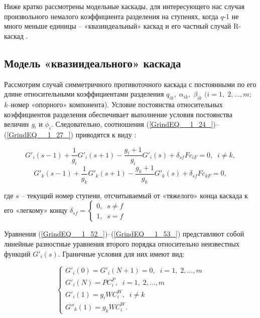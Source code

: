 Ниже кратко рассмотрены модельные каскады, для интересующего нас случая произвольного немалого коэффициента разделения на ступенях, когда $q$-1 не много меньше единицы  -- «квазиидеальный» каскад и его частный случай R-каскад \cite{sazykinKvaziidealnyeKaskadyDlya2000}.

\subsection{Модель «квазиидеального» каскада}

Рассмотрим случай симметричного противоточного каскада с постоянными по его длине относительными коэффициентами разделения $q_{ik} ,\; \alpha _{ik} ,\; \beta _{ik} $ $(i=1,\; 2,...,m;$ \textit{k}--номер «опорного» компонента). Условие постоянства относительных коэффициентов разделения обеспечивает выполнение условия постоянства величин \textit{g${}_{i}$} и $\phi _{i} $. Следовательно, соотношения (\ref{GrindEQ__1_24_})--(\ref{GrindEQ__1_27_}) приводятся к виду \cite{sulaberidzeTeoriyaKaskadovDlya2011}:

\begin{equation} \label{GrindEQ__1_52_} 
  G'_{i} (s-1)+\frac{1}{g_{i} } G'_{i} (s+1)-\frac{g_{i} +1}{g_{i} } G'_{i} (s)+\delta _{sf} Fc_{iF} =0,\; \; i\ne k, 
  \end{equation} 
  \begin{equation} \label{GrindEQ__1_53_} 
  G'_{k} (s-1)+\frac{1}{g_{k} } G'_{k} (s+1)-\frac{g_{k} +1}{g_{k} } G'_{k} (s)+\delta _{sf} Fc_{kF} =0, 
  \end{equation}

где $s$ – текущий номер ступени, отсчитываемый от «тяжелого» конца каскада к его «легкому» концу $\delta _{sf} =\left\{\begin{array}{l} {0,\; \; s\ne f} \\ {1,\; \; s=f} \end{array}\right. $

Уравнения (\ref{GrindEQ__1_52_})--(\ref{GrindEQ__1_53_}) представляют собой линейные разностные уравнения второго порядка относительно неизвестных функций $G'_{i} (s)$. Граничные условия для них имеют вид:

\begin{equation} \label{GrindEQ__1_54_} 
  \left\{\begin{array}{l} {G'_{i} (0)=G'_{i} (N+1)=0,\; \; i=1,\; 2,...,m} \\ {G'_{i} (N)=PC_{i}^{P} ,\; \; i=1,\; 2,...,m} \\ {G'_{i} (1)=g_{i} WC_{i}^{W} ,\; \; i\ne k} \\ {G''_{k} (1)=g_{k} WC_{i}^{W} .} \end{array}\right.  
\end{equation} 

